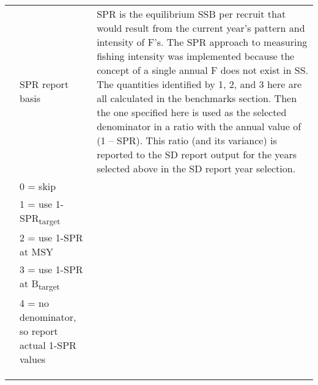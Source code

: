 \begin{landscape}
\begin{longtable}{p{3cm} p{7cm} p{11cm}}
 \pagebreak
 1 & SPR report basis & \multirow{1}{1cm}[-0.1cm]{\parbox{11cm}{SPR is the equilibrium SSB per recruit that would result from the current year’s pattern and intensity of F’s.  The SPR approach to measuring fishing intensity was implemented because the concept of a single annual F does not exist in SS.
		The quantities identified by 1, 2, and 3 here are all calculated in the benchmarks section.  Then the one specified here is used as the selected denominator in a ratio with the annual value of (1 – SPR). This ratio (and its variance) is reported to the SD report output for the years selected above in the SD report year selection.}}\\
   & 0 = skip & \\
   & 1 = use 1-SPR\textsubscript{target} & \\
   & 2 = use 1-SPR at MSY & \\
   & 3 = use 1-SPR at B\textsubscript{target} & \\
   & 4 = no denominator, so report actual 1-SPR values & \\
   & & \\
   & & \\
   & & \\
  

\end{longtable}
\end{landscape}
